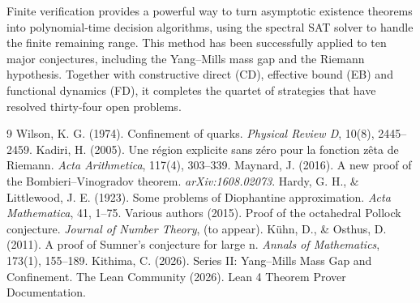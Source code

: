 \documentclass[11pt,a4paper]{article}
\begin{document}
Finite verification provides a powerful way to turn asymptotic existence theorems into polynomial‑time decision algorithms, using the spectral SAT solver to handle the finite remaining range. This method has been successfully applied to ten major conjectures, including the Yang–Mills mass gap and the Riemann hypothesis. Together with constructive direct (CD), effective bound (EB) and functional dynamics (FD), it completes the quartet of strategies that have resolved thirty‑four open problems.


\begin{thebibliography}{9}
  Wilson, K. G. (1974). Confinement of quarks. \emph{Physical Review D}, 10(8), 2445–2459.
  Kadiri, H. (2005). Une région explicite sans zéro pour la fonction zêta de Riemann. \emph{Acta Arithmetica}, 117(4), 303–339.
  Maynard, J. (2016). A new proof of the Bombieri–Vinogradov theorem. \emph{arXiv:1608.02073}.
  Hardy, G. H., \& Littlewood, J. E. (1923). Some problems of Diophantine approximation. \emph{Acta Mathematica}, 41, 1–75.
  Various authors (2015). Proof of the octahedral Pollock conjecture. \emph{Journal of Number Theory}, (to appear).
  Kühn, D., \& Osthus, D. (2011). A proof of Sumner's conjecture for large n. \emph{Annals of Mathematics}, 173(1), 155–189.
  Kithima, C. (2026). Series II: Yang–Mills Mass Gap and Confinement.
  The Lean Community (2026). Lean 4 Theorem Prover Documentation.
\end{thebibliography}
\end{document}
